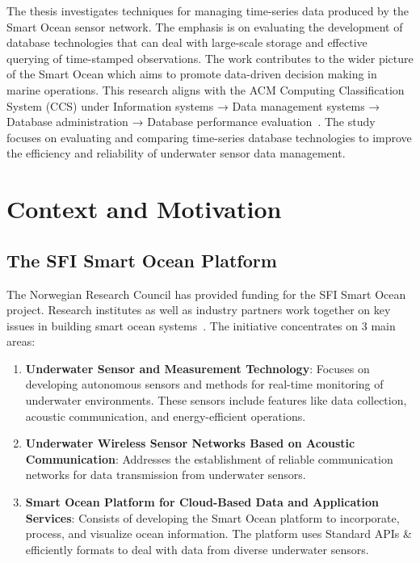 The thesis investigates techniques for managing time-series data produced by
the Smart Ocean sensor network. The emphasis is on evaluating the development
of database technologies that can deal with large-scale storage and effective
querying of time-stamped observations. The work contributes to the wider
picture of the Smart Ocean which aims to promote data-driven decision making in
marine operations. This research aligns with the ACM Computing Classification
System (CCS) under Information systems → Data management systems → Database
administration → Database performance evaluation~\cite{ACM-CCS-2012}. The study
focuses on
evaluating and comparing time-series database technologies to improve the
efficiency and reliability of underwater sensor data management.

\section{Context and Motivation}
\subsection{The SFI Smart Ocean Platform}
The Norwegian Research Council has provided funding for the SFI Smart Ocean
project.
Research institutes as well as industry partners work together on key issues in
building smart ocean systems~\cite{SmartOceanHub}. The initiative concentrates
on 3 main areas:

\begin{enumerate}
      \item \textbf{Underwater Sensor and Measurement Technology}: Focuses on
            developing autonomous sensors and methods for real-time monitoring
            of underwater environments. These sensors include features like
            data
            collection, acoustic communication, and energy-efficient
            operations.

      \item \textbf{Underwater Wireless Sensor Networks Based on Acoustic
                  Communication}: Addresses the establishment of reliable
            communication networks for data transmission from underwater
            sensors.

      \item \textbf{Smart Ocean Platform for Cloud-Based Data and Application
                  Services}: Consists of developing the Smart Ocean platform to
            incorporate, process, and visualize ocean information. The platform
            uses Standard APIs \& efficiently formats to deal with data from
            diverse underwater sensors.
\end{enumerate}

